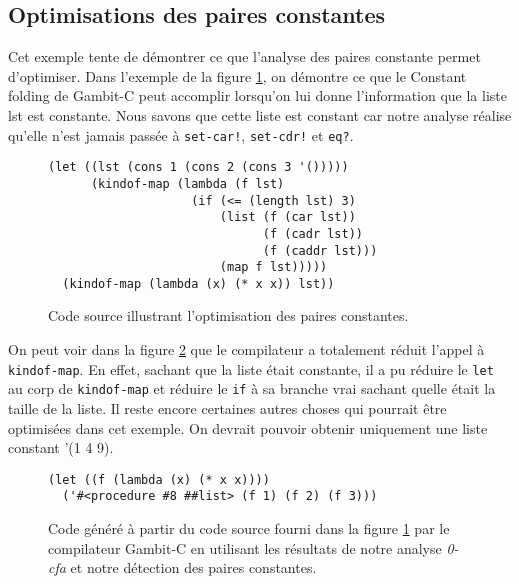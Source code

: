 \clearpage

\subsection{Optimisations des paires constantes}

Cet exemple tente de démontrer ce que l'analyse des paires constante permet
d'optimiser. Dans l'exemple de la figure \ref{cfa-ex2-source}, on démontre
ce que le \og Constant folding \fg de Gambit-C peut accomplir lorsqu'on lui
donne l'information que la liste lst est constante. Nous savons que cette
liste est constant car notre analyse réalise qu'elle n'est jamais passée à
\texttt{set-car!}, \texttt{set-cdr!} et \texttt{eq?}.

\begin{figure}[htbp!]
  \begin{lstlisting}
(let ((lst (cons 1 (cons 2 (cons 3 '()))))
      (kindof-map (lambda (f lst)
                    (if (<= (length lst) 3)
                        (list (f (car lst))
                              (f (cadr lst))
                              (f (caddr lst)))
                        (map f lst)))))
  (kindof-map (lambda (x) (* x x)) lst))
  \end{lstlisting}
  \caption{Code source illustrant l'optimisation des paires constantes.}
  \label{cfa-ex2-source}
\end{figure}

On peut voir dans la figure \ref{cfa-ex2-out} que le compilateur a totalement
réduit l'appel à \texttt{kindof-map}. En effet, sachant que la liste était
constante, il a pu réduire le \texttt{let} au corp de \texttt{kindof-map} et
réduire le \texttt{if} à sa branche vrai sachant quelle était la taille de la liste.
Il reste encore certaines autres choses qui pourrait être optimisées dans cet exemple.
On devrait pouvoir obtenir uniquement une liste constant '(1 4 9).

\begin{figure}[htbp!]
  \begin{lstlisting}
(let ((f (lambda (x) (* x x))))
  ('#<procedure #8 ##list> (f 1) (f 2) (f 3)))
  \end{lstlisting}
  \caption{Code généré à partir du code source fourni dans la figure
    \ref{cfa-ex2-source} par le compilateur Gambit-C en utilisant les
    résultats de notre analyse \textit{0-cfa} et notre détection des
    paires constantes.}
  \label{cfa-ex2-out}
\end{figure}

